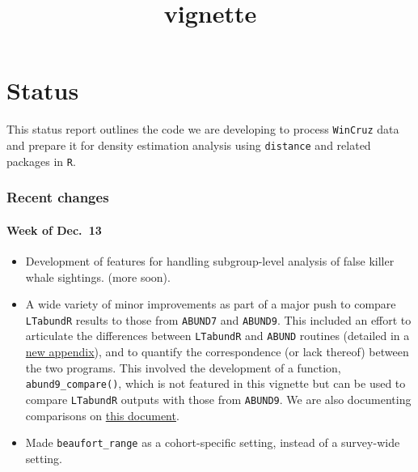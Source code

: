 \documentclass[
]{book}
\title{vignette}
\author{}
\date{\vspace{-2.5em}}
\begin{document}
\maketitle

{
\setcounter{tocdepth}{1}
\tableofcontents
}
\hypertarget{status}{%
\chapter{Status}\label{status}}

This status report outlines the code we are developing to process \texttt{WinCruz} data and prepare it for density estimation analysis using \texttt{distance} and related packages in \texttt{R}.

\hypertarget{recent-changes}{%
\subsection*{Recent changes}\label{recent-changes}}

\hypertarget{week-of-dec.-13}{%
\subsubsection*{Week of Dec.~13}\label{week-of-dec.-13}}

\begin{itemize}
\item
  Development of features for handling subgroup-level analysis of false killer whale sightings. (more soon).
\item
  A wide variety of minor improvements as part of a major push to compare \texttt{LTabundR} results to those from \texttt{ABUND7} and \texttt{ABUND9}. This included an effort to articulate the differences between \texttt{LTabundR} and \texttt{ABUND} routines (detailed in a \protect\hyperlink{abund9_compare}{new appendix}), and to quantify the correspondence (or lack thereof) between the two programs. This involved the development of a function, \texttt{abund9\_compare()}, which is not featured in this vignette but can be used to compare \texttt{LTabundR} outputs with those from \texttt{ABUND9}. We are also documenting comparisons on \href{https://docs.google.com/document/d/1_EZqzOnwSZZCitqTJFIbznGy2Njwbj1YOqMQcbcHI7k/edit?usp=sharing}{this document}.
\item
  Made \texttt{beaufort\_range} as a cohort-specific setting, instead of a survey-wide setting.
\end{itemize}
\end{document}
